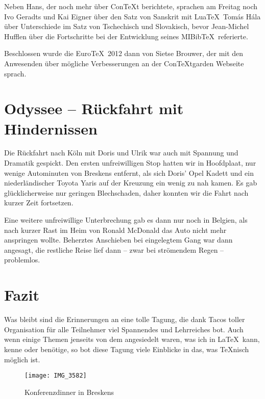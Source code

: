 \documentclass[12pt,ngerman]{dtk}
\begin{document}
Neben Hans, der noch mehr über Con\TeX t berichtete, sprachen am Freitag noch Ivo Geradts und Kai Eigner über den Satz von Sanskrit mit Lua\TeX\, Tomás Hála über Unterschiede im Satz von Tschechisch und Slovakisch, bevor Jean-Michel Hufflen über die Fortschritte bei der Entwicklung seines MIBib\TeX\ referierte. 

Beschlossen wurde die Euro\TeX\ 2012 dann von Sietse Brouwer, der mit den Anwesenden über mögliche Verbesserungen an der Con\TeX tgarden Webseite sprach.

\section{Odyssee -- Rückfahrt mit Hindernissen}

Die Rückfahrt nach Köln mit Doris und Ulrik war auch mit Spannung und Dramatik gespickt. Den ersten unfreiwilligen Stop hatten wir in Hoofdplaat, nur wenige Autominuten von Breskens entfernt, als sich Doris' Opel Kadett und ein niederländischer Toyota Yaris auf der Kreuzung ein wenig zu nah kamen. Es gab glücklicherweise nur geringen Blechschaden, daher konnten wir die Fahrt nach kurzer Zeit fortsetzen. 

Eine weitere unfreiwillige Unterbrechung gab es dann nur noch in Belgien, als nach kurzer Rast im Heim  von Ronald McDonald das Auto nicht mehr anspringen wollte. Beherztes Anschieben bei eingelegtem Gang war dann angesagt, die restliche Reise lief dann -- zwar bei strömendem Regen -- problemlos.

\section{Fazit}

Was bleibt sind die Erinnerungen an eine tolle Tagung, die dank Tacos toller Organisation für alle Teilnehmer viel Spannendes und Lehrreiches bot. Auch wenn einige Themen jenseits von dem angesiedelt waren, was ich in \LaTeX\ kann, kenne  oder benötige, so bot diese Tagung viele Einblicke in das, was \TeX nisch möglich ist. 




\begin{figure}
\centering
\texttt{[image: IMG\_3582]}
\caption{Konferenzdinner in Breskens}
\end{figure}
\end{document}
